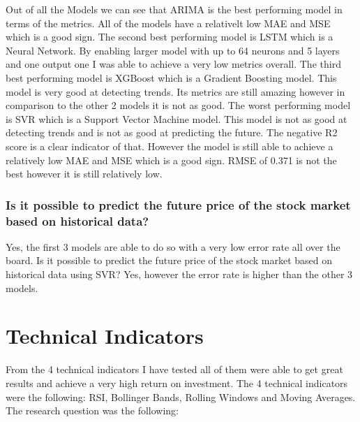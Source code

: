 \documentclass{imc-inf}
\begin{document}
		Out of all the Models we can see that ARIMA is the best performing model in terms of the metrics. All of the models have a relativelt low MAE and MSE which is a good sign. The second best performing model is LSTM which is a Neural Network.
		By enabling larger model with up to 64 neurons and 5 layers and one output one I was able to achieve a very low metrics overall. The third best performing model is XGBoost which is a Gradient Boosting model. This model is very good at detecting trends.
		Its metrics are still amazing however in comparison to the other 2 models it is not as good. The worst performing model is SVR which is a Support Vector Machine model. This model is not as good at detecting trends and is not as good at predicting the future.
		The negative R2 score is a clear indicator of that. However the model is still able to achieve a relatively low MAE and MSE which is a good sign. RMSE of 0.371 is not the best however it is still relatively low.
		\subsubsection{Is it possible to predict the future price of the stock market based on historical data?}
			Yes, the first 3 models are able to do so with a very low error rate all over the board. 
			Is it possible to predict the future price of the stock market based on historical data using SVR? Yes, however the error rate is higher than the other 3 models.
	
	\section{Technical Indicators}
		From the 4 technical indicators I have tested all of them were able to get great results and achieve a very high return on investment. The 4 technical indicators were the following: RSI, Bollinger Bands, Rolling Windows and Moving Averages.
		The research question was the following:
\end{document}
